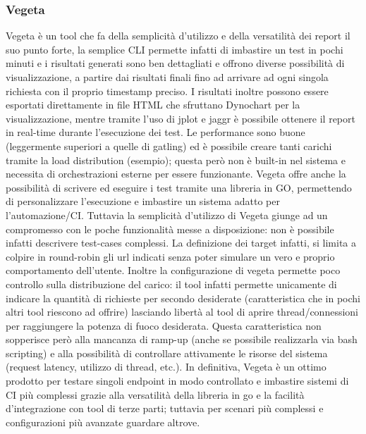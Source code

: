 \subsubsection{Vegeta}
Vegeta è un tool che fa della semplicità d’utilizzo e della versatilità dei report il suo punto forte, la semplice CLI permette infatti di imbastire un test in pochi minuti e i risultati generati sono ben dettagliati e offrono diverse possibilità di visualizzazione, a partire dai risultati finali fino ad arrivare ad ogni singola richiesta con il proprio timestamp preciso. I risultati inoltre possono essere esportati direttamente in file HTML che sfruttano Dynochart per la visualizzazione, mentre tramite l’uso di jplot e jaggr è possibile ottenere il report in real-time durante l’esecuzione dei test.
Le performance sono buone (leggermente superiori a quelle di gatling) ed è possibile creare tanti carichi tramite la load distribution (esempio); questa però non è built-in nel sistema e necessita di orchestrazioni esterne per essere funzionante.
Vegeta offre anche la possibilità di scrivere ed eseguire i test tramite una libreria in GO, permettendo di personalizzare l’esecuzione e imbastire un sistema adatto per l’automazione/CI.
Tuttavia la semplicità d’utilizzo di Vegeta giunge ad un compromesso con le poche funzionalità messe a disposizione: non è possibile infatti descrivere test-cases complessi. La definizione dei target infatti, si limita a colpire in round-robin gli url indicati senza poter simulare un vero e proprio comportamento dell’utente.
Inoltre la configurazione di vegeta permette poco controllo sulla distribuzione del carico: il tool infatti permette unicamente di indicare la quantità di richieste per secondo desiderate (caratteristica che in pochi altri tool riescono ad offrire) lasciando libertà al tool di aprire thread/connessioni per raggiungere la potenza di fuoco desiderata. Questa caratteristica non sopperisce però alla mancanza di ramp-up (anche se possibile realizzarla via bash scripting) e alla possibilità di controllare attivamente le risorse del sistema (request latency, utilizzo di thread, etc.).
In definitiva, Vegeta è un ottimo prodotto per testare singoli endpoint in modo controllato e imbastire sistemi di CI più complessi grazie alla versatilità della libreria in go e la facilità d’integrazione con tool di terze parti; tuttavia per scenari più complessi e configurazioni più avanzate guardare altrove.
